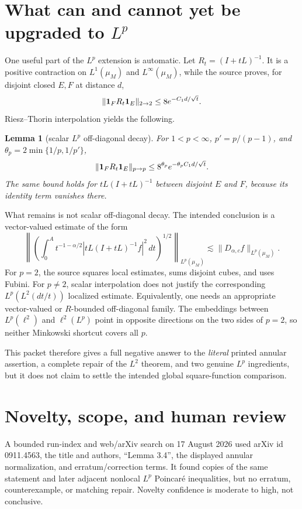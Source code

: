 \documentclass[11pt]{article}
\newtheorem{lemma}{Lemma}
\newcommand{\muM}{\mu_M}
\begin{document}
\section{What can and cannot yet be upgraded to \texorpdfstring{$L^p$}{Lp}}

One useful part of the $L^p$ extension is automatic.  Let
$R_t=(I+tL)^{-1}$.  It is a positive contraction on $L^1(\muM)$ and
$L^\infty(\muM)$, while the source proves, for disjoint closed $E,F$ at
distance $d$,
\[
 \|{\bf1}_FR_t{\bf1}_E\|_{2\to2}\le8e^{-C_1d/\sqrt t}.
\]
Riesz--Thorin interpolation yields the following.

\begin{lemma}[scalar $L^p$ off-diagonal decay]\label{lem:lp}
For $1<p<\infty$, $p'=p/(p-1)$, and
$\theta_p=2\min\{1/p,1/p'\}$,
\[
 \|{\bf1}_FR_t{\bf1}_E\|_{p\to p}
 \le8^{\theta_p}e^{-\theta_p C_1d/\sqrt t}.
\]
The same bound holds for $tL(I+tL)^{-1}$ between disjoint $E$ and $F$,
because its identity term vanishes there.
\end{lemma}

What remains is not scalar off-diagonal decay.  The intended conclusion is a
vector-valued estimate of the form
\[
 \left\|\left(\int_0^A t^{-1-\alpha/2}
 |tL(I+tL)^{-1}f|^2\,dt\right)^{1/2}\right\|_{L^p(\muM)}
 \lesssim \|D_{\alpha,c}f\|_{L^p(\muM)}.
\]
For $p=2$, the source squares local estimates, sums disjoint cubes, and uses
Fubini.  For $p\ne2$, scalar interpolation does not justify the corresponding
$L^p(L^2(dt/t))$ localized estimate.  Equivalently, one needs an appropriate
vector-valued or $R$-bounded off-diagonal family.  The embeddings between
$L^p(\ell^2)$ and $\ell^2(L^p)$ point in opposite directions on the two sides
of $p=2$, so neither Minkowski shortcut covers all $p$.

This packet therefore gives a full negative answer to the \emph{literal}
printed annular assertion, a complete repair of the $L^2$ theorem, and two
genuine $L^p$ ingredients, but it does not claim to settle the intended global
square-function comparison.

\section{Novelty, scope, and human review}

A bounded run-index and web/arXiv search on 17 August 2026 used arXiv id
0911.4563, the title and authors, ``Lemma 3.4'', the displayed annular
normalization, and erratum/correction terms.  It found copies of the same
statement and later adjacent nonlocal $L^p$ Poincar\'e inequalities, but no
erratum, counterexample, or matching repair.  Novelty confidence is moderate
to high, not conclusive.
\end{document}
